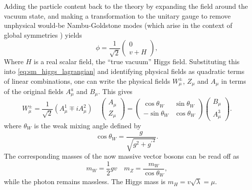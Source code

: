 Adding the particle content back to the theory by expanding the field around the vacuum state, and making a transformation to the unitary gauge to remove unphysical would\nobreakdash-be Nambu-Goldstone modes (which arise in the context of global symmetries \cite{PhysRev.117.648,Goldstone1961FieldTW}) yields
%
\begin{equation}
  \phi = 
  \frac{1}{\sqrt{2}}
  \begin{pmatrix}
    0 \\ v + H
  \end{pmatrix} ,
\end{equation}
%
Where $H$ is a real scalar field, the ``true vacuum'' Higgs field.
Substituting this into \cref{eq:sm_higgs_lagrangian} and identifying physical fields as quadratic terms of linear combinations, one can write the physical fields $W_\mu^\pm$, $Z_\mu$ and $A_\mu$ in terms of the original fields $A^a_\mu$ and $B_\mu$.
This gives
%
\begin{equation}\label{eq:ew_physical_unphysical_fields}
  W_\mu^\pm = 
  \frac{1}{\sqrt{2}} (A^1_\mu \mp i A^2_\mu)
  \quad
  \begin{pmatrix}
    A_\mu \\ Z_\mu
  \end{pmatrix} =
  \begin{pmatrix}
      \cos\theta_W &  \sin\theta_W \\ 
    - \sin\theta_W &  \cos\theta_W
  \end{pmatrix}
  \begin{pmatrix}
    B_\mu \\ A^3_\mu 
  \end{pmatrix} .
\end{equation}
%
where $\theta_W$ is the weak mixing angle defined by 
%
\begin{equation}\label{eq:ew_coupling_weak_mixing_angle}
  \cos\theta_W = \frac{g}{\sqrt{g^2 + {g^\prime}^2}} .
\end{equation}
%
The corresponding masses of the now massive vector bosons can be read off as 
%
\begin{equation}
  m_W = \frac{1}{2} g v
  \quad
  m_Z = \frac{m_W}{\cos\theta_W} , %
\end{equation}
%
while the photon remains massless.
The Higgs mass is $m_H = v \sqrt{\lambda} = \mu$.

